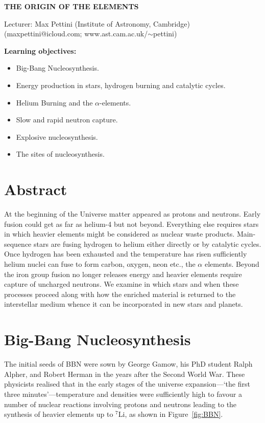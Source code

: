 \documentclass[a4paper,12pt]{report}
\begin{document}
{\normalsize

\begin{center}
\textbf{THE ORIGIN OF THE ELEMENTS}
\end{center}

Lecturer: Max Pettini  (Institute of Astronomy, Cambridge)\\
(maxpettini@icloud.com; www.ast.cam.ac.uk/$\sim$pettini)

{\bf Learning objectives:}
\begin{itemize}
\item Big-Bang Nucleosynthesis.
\item Energy production in stars, hydrogen burning and catalytic cycles.
\item Helium Burning and the $\alpha$-elements.
\item Slow and rapid neutron capture.
\item Explosive nucleosynthesis.
\item The sites of nucleosynthesis.
\end{itemize}

\section{Abstract}
At the beginning of the Universe matter appeared as protons and
neutrons.  Early fusion could get as far as helium-4 but not beyond.
Everything else requires stars in which heavier elements might be
considered as nuclear waste products.  Main-sequence stars are fusing
hydrogen to helium either directly or by catalytic cycles.  Once
hydrogen has been exhausted and the temperature has risen sufficiently
helium nuclei can fuse to form carbon, oxygen, neon etc., the $\alpha$
elements.  Beyond the iron group fusion no longer releases energy and
heavier elements require capture of uncharged neutrons.  We examine
in which stars and when these processes proceed along with how the
enriched material is returned to the interstellar medium whence it can
be incorporated in new stars and planets.


\section{Big-Bang Nucleosynthesis}
The initial seeds of BBN were sown by George Gamow, his PhD student Ralph Alpher, and Robert Herman in the years after the Second World War. These physicists realised that in the early 
stages of the universe expansion---`the first three minutes'---temperature and densities were sufficiently high to favour a number of nuclear reactions involving protons and neutrons leading to the synthesis of heavier elements up to $^7$Li,  as shown in Figure~\ref{fig:BBN}. 


}
\end{document}
